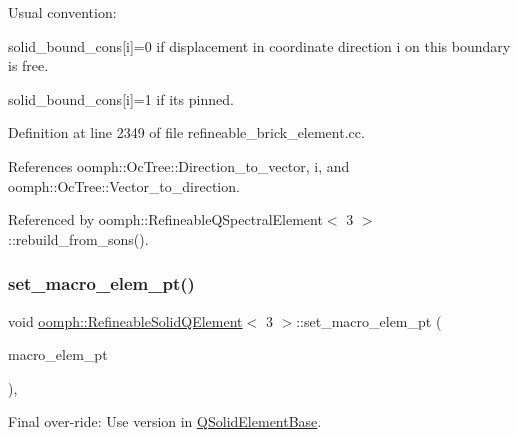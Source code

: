 Usual convention\+:
\begin{DoxyItemize}
\item solid\+\_\+bound\+\_\+cons\mbox{[}i\mbox{]}=0 if displacement in coordinate direction i on this boundary is free.
\item solid\+\_\+bound\+\_\+cons\mbox{[}i\mbox{]}=1 if it\textquotesingle{}s pinned. 
\end{DoxyItemize}

Definition at line 2349 of file refineable\+\_\+brick\+\_\+element.\+cc.



References oomph\+::\+Oc\+Tree\+::\+Direction\+\_\+to\+\_\+vector, i, and oomph\+::\+Oc\+Tree\+::\+Vector\+\_\+to\+\_\+direction.



Referenced by oomph\+::\+Refineable\+Q\+Spectral\+Element$<$ 3 $>$\+::rebuild\+\_\+from\+\_\+sons().

\mbox{\label{classoomph_1_1RefineableSolidQElement_3_013_01_4_a2b1aa7874048e0f38370ae7bf761d315}} 
\subsubsection{\texorpdfstring{set\+\_\+macro\+\_\+elem\+\_\+pt()}{set\_macro\_elem\_pt()}\hspace{0.1cm}{\footnotesize\ttfamily [1/2]}}
{\footnotesize\ttfamily void \hyperlink{classoomph_1_1RefineableSolidQElement}{oomph\+::\+Refineable\+Solid\+Q\+Element}$<$ 3 $>$\+::set\+\_\+macro\+\_\+elem\+\_\+pt (\begin{DoxyParamCaption}\item[{\hyperlink{classoomph_1_1MacroElement}{Macro\+Element} $\ast$}]{macro\+\_\+elem\+\_\+pt }\end{DoxyParamCaption})\hspace{0.3cm}{\ttfamily [inline]}, {\ttfamily [virtual]}}



Final over-\/ride\+: Use version in \hyperlink{classoomph_1_1QSolidElementBase}{Q\+Solid\+Element\+Base}. 



